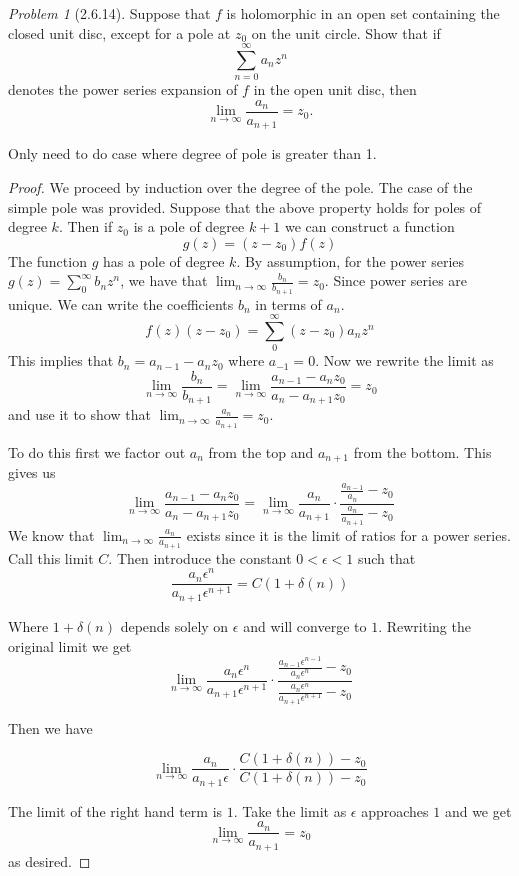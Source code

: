 \documentclass[10pt]{article}
\theoremstyle{remark}
\newtheorem{problem}{Problem}
\theoremstyle{remark}
\begin{document}
\begin{problem}[2.6.14]
  Suppose that $f$ is holomorphic in an open set containing the closed unit disc,
  except for a pole at $z_0$ on the unit circle. Show that if
  \[
    \sum_{n=0}^\infty a_n z^n
  \]
  denotes the power series expansion of $f$ in the open unit disc, then
  \[
    \lim_{n\rightarrow\infty}\frac{a_n}{a_{n+1}}=z_0.
  \]
  
  Only need to do case where degree of pole is greater than 1.
\end{problem}

\begin{proof}
  We proceed by induction over the degree of the pole. The case of the simple
  pole was provided. Suppose that the above property holds for poles of
  degree $k$. Then if $z_0$ is a pole of degree $k+1$ we can construct a function
  \[
    g\left(z\right)=\left(z-z_0\right)f\left(z\right)
  \]
  The function $g$ has a pole of degree $k$. By assumption, for the power series
  $g\left(z\right)=\sum_0^\infty b_nz^n$, we have that $\lim_{n\rightarrow\infty}\frac{b_n}{b_{n+1}}=z_0$. Since
  power series are unique. We can write the coefficients $b_n$ in terms of $a_n$.
  \[
    f\left(z\right)\left(z-z_0\right)=\sum_0^\infty\left(z-z_0\right)a_nz^n
  \]
  This implies that $b_n=a_{n-1}-a_nz_0$ where $a_{-1}=0$. Now we rewrite the limit
  as
  \[
    \lim_{n\rightarrow\infty}\frac{b_n}{b_{n+1}}=\lim_{n\rightarrow\infty}\frac{a_{n-1}-a_nz_0}{a_n-a_{n+1}z_0}=z_0
  \]
  and use it to show that $\lim_{n\rightarrow\infty}\frac{a_n}{a_{n+1}}=z_0$.

  To do this first we factor out $a_n$ from the top and $a_{n+1}$ from the bottom. This
  gives us
  \[
    \lim_{n\rightarrow\infty}\frac{a_{n-1}-a_nz_0}{a_n-a_{n+1}z_0}=\lim_{n\rightarrow\infty}\frac{a_n}{a_{n+1}}\cdot\frac{\frac{a_{n-1}}{a_n}-z_0}{\frac{a_n}{a_{n+1}}-z_0}
  \]
  We know that $\lim_{n\rightarrow\infty}\frac{a_n}{a_{n+1}}$ exists since it is
  the limit of ratios for a power series. Call this limit $C$. Then introduce the constant $0<\epsilon<1$
  such that
  \[
    \frac{a_n\epsilon^n}{a_{n+1}\epsilon^{n+1}}=C\left(1+\delta\left(n\right)\right)
  \]

  Where $1+\delta\left(n\right)$ depends solely on $\epsilon$ and will converge to $1$. Rewriting the original limit we get
  \[
    \lim_{n\rightarrow\infty}\frac{a_n\epsilon^n}{a_{n+1}\epsilon^{n+1}}\cdot\frac{\frac{a_{n-1}\epsilon^{n-1}}{a_n\epsilon^{n}}-z_0}{\frac{a_n\epsilon^{n}}{a_{n+1}\epsilon^{n+1}}-z_0}
  \]

  Then we have

  \[
    \lim_{n\rightarrow\infty}\frac{a_n}{a_{n+1}\epsilon}\cdot\frac{C\left(1+\delta\left(n\right)\right)-z_0}{C\left(1+\delta\left(n\right)\right)-z_0}
  \]

  The limit of the right hand term is $1$. Take the limit as $\epsilon$ approaches $1$ and we
  get
  \[
    \lim_{n\rightarrow\infty}\frac{a_n}{a_{n+1}}=z_0
  \]
  as desired.
\end{proof}
\end{document}
